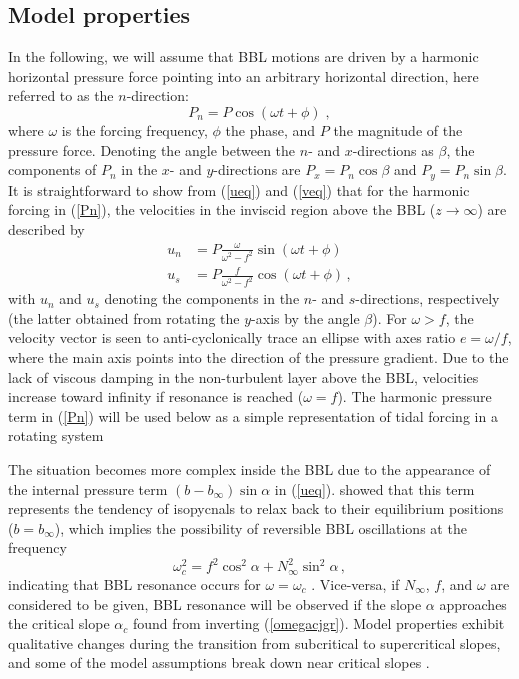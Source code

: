\subsection{Model properties}\label{modelproperties}
In the following, we will assume that BBL motions are driven by a
harmonic horizontal pressure force pointing into an arbitrary
horizontal direction, here referred to as the $n$-direction:
\begin{equation}
  \label{Pn}
  P_n = P \cos (\omega t + \phi) \; ,
\end{equation}
where $\omega$ is the forcing frequency, $\phi$ the phase, and $P$ the
magnitude of the pressure force. Denoting the angle between the $n$-
and $x$-directions as $\beta$, the components of $P_n$ in the $x$- and
$y$-directions are $P_x = P_n \cos \beta$ and $P_y = P_n \sin
\beta$. It is straightforward to show from (\ref{ueq}) and (\ref{veq})
that for the harmonic forcing in (\ref{Pn}), the velocities in the
inviscid region above the BBL ($z\rightarrow \infty$) are described by
\begin{align}
  \label{Un}
  u_n & = P \frac{\omega}{\omega^2 - f^2} \sin ( \omega t + \phi) \\
  u_s & = P \frac{f     }{\omega^2 - f^2} \cos ( \omega t + \phi) \, ,
  \label{Us}
\end{align}
with $u_n$ and $u_s$ denoting the components in the $n$- and
$s$-directions, respectively (the latter obtained from rotating the
$y$-axis by the angle $\beta$). For $\omega>f$, the velocity vector is
seen to anti-cyclonically trace an ellipse with axes ratio
$e=\omega/f$, where the main axis points into the direction of the
pressure gradient. Due to the lack of viscous damping in the
non-turbulent layer above the BBL, velocities increase toward infinity
if resonance is reached ($\omega=f$). The harmonic pressure term in
(\ref{Pn}) will be used below as a simple representation of tidal
forcing in a rotating system

The situation becomes more complex inside the BBL due to the
appearance of the internal pressure term $(b-b_\infty) \sin \alpha$ in
(\ref{ueq}). \cite{Umlaufetal2015a} showed that this term represents
the tendency of isopycnals to relax back to their equilibrium
positions ($b=b_\infty$), which implies the possibility of reversible
BBL oscillations at the frequency
\begin{equation}
  \label{omegacjgr}
  \omega_c^2 = f^2 \cos^2 \alpha + N_\infty^2 \sin^2 \alpha \, ,
\end{equation}
indicating that BBL resonance occurs for $\omega=\omega_c$
\citep{UmlaufBurchard2011a}. Vice-versa, if $N_\infty$, $f$, and
$\omega$ are considered to be given, BBL resonance will be observed if
the slope $\alpha$ approaches the critical slope $\alpha_c$ found from
inverting (\ref{omegacjgr}). Model properties exhibit qualitative changes
during the transition from subcritical to supercritical slopes, and
some of the model assumptions break down near critical slopes
\citep{UmlaufBurchard2011a,schulzumlauf2016}.

